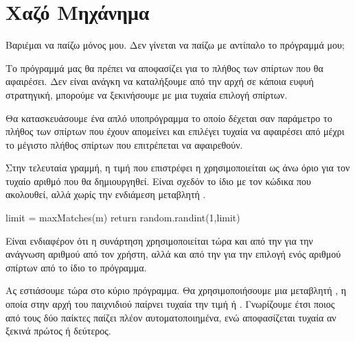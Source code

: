 \documentclass[a4paper,11pt,oneside]{book}
\begin{document}



\section{Χαζό Μηχάνημα}

\begin{question}
Βαριέμαι να παίζω μόνος μου. Δεν γίνεται να παίζω με αντίπαλο το πρόγραμμά μου;
\end{question}

Το πρόγραμμά μας θα πρέπει να αποφασίζει για το πλήθος των σπίρτων που θα αφαιρέσει. Δεν είναι ανάγκη να καταλήξουμε από την αρχή σε κάποια ευφυή στρατηγική, μπορούμε να ξεκινήσουμε με μια τυχαία επιλογή σπίρτων. 

Θα κατασκευάσουμε ένα απλό υποπρόγραμμα το οποίο δέχεται σαν παράμετρο το πλήθος των σπίρτων που έχουν απομείνει και επιλέγει τυχαία να αφαιρέσει από  μέχρι το μέγιστο πλήθος σπίρτων που επιτρέπεται να αφαιρεθούν.

\clearpage

Στην τελευταία γραμμή, η τιμή που επιστρέφει η  χρησιμοποιείται ως άνω όριο για τον τυχαίο αριθμό που θα δημιουργηθεί. Είναι σχεδόν το ίδιο με τον κώδικα που ακολουθεί, αλλά χωρίς την ενδιάμεση μεταβλητή .

\begin{pycode}
    limit = maxMatches(m)
    return random.randint(1,limit)
\end{pycode}

Είναι ενδιαφέρον ότι η συνάρτηση  χρησιμοποιείται τώρα και από την  για την ανάγνωση αριθμού από τον χρήστη, αλλά και από την  για την επιλογή ενός αριθμού σπίρτων από το ίδιο το πρόγραμμα.

Ας εστιάσουμε τώρα στο κύριο πρόγραμμα. Θα χρησιμοποιήσουμε μια μεταβλητή , η οποία στην αρχή του παιχνιδιού παίρνει τυχαία την τιμή  ή . Γνωρίζουμε έτσι ποιος από τους δύο παίκτες παίζει πλέον αυτοματοποιημένα, ενώ αποφασίζεται τυχαία αν ξεκινά πρώτος ή δεύτερος. 
\end{document}
